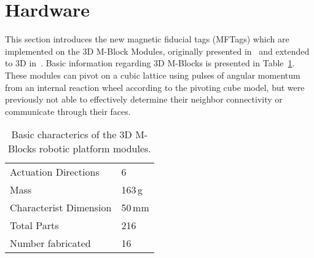 \section{Hardware}
\label{sec:Hardware}

This section introduces the new magnetic fiducial tags (MFTags) which are implemented on the 3D M-Block Modules, originally presented in~\cite{RomanishinRus-IROS13} and extended to 3D in~\cite{Romanishin20153d}. Basic information regarding 3D M-Blocks is presented in Table~\ref{tab:hardwareOverviewTable}. These modules can pivot on a cubic lattice using pulses of angular momentum from an internal reaction wheel according to the pivoting cube model, but were previously not able to effectively determine their neighbor connectivity or communicate through their faces. 
\begin{table}[h]
	\caption{Basic characterics of the 3D M-Blocks robotic platform modules.}
	\centering
	\begin{tabular}{ p{3.5cm}  p{2cm} }
		\hline
		Actuation Directions & 6 \\
		Mass  & 163\,g \\
		Characterist Dimension & 50\,mm \\
		Total Parts  & 216 \\
		Number fabricated  & 16 \\
	\end{tabular}
	\label{tab:hardwareOverviewTable}
\end{table}

